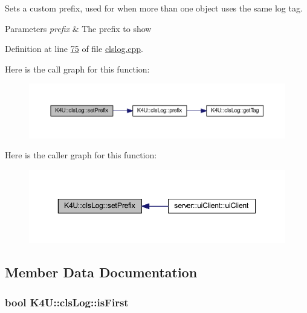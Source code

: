 Sets a custom prefix, used for when more than one object uses the same log tag. 


\begin{DoxyParams}{Parameters}
{\em prefix} & The prefix to show \\
\hline
\end{DoxyParams}


Definition at line \hyperlink{clslog_8cpp_source_l00075}{75} of file \hyperlink{clslog_8cpp_source}{clslog.\-cpp}.



Here is the call graph for this function\-:\nopagebreak
\begin{figure}[H]
\begin{center}
\leavevmode
\includegraphics[width=350pt]{da/d64/class_k4_u_1_1cls_log_acce6f46545b0de7dcc21b69dda54b246_cgraph}
\end{center}
\end{figure}




Here is the caller graph for this function\-:
\nopagebreak
\begin{figure}[H]
\begin{center}
\leavevmode
\includegraphics[width=350pt]{da/d64/class_k4_u_1_1cls_log_acce6f46545b0de7dcc21b69dda54b246_icgraph}
\end{center}
\end{figure}




\subsection{Member Data Documentation}
\hypertarget{class_k4_u_1_1cls_log_aacbc8798b8923df2c0c45333f88b8c5a}{
\subsubsection[{is\-First}]{\setlength{\rightskip}{0pt plus 5cm}bool K4\-U\-::cls\-Log\-::is\-First\hspace{0.3cm}{\ttfamily [private]}}}\label{da/d64/class_k4_u_1_1cls_log_aacbc8798b8923df2c0c45333f88b8c5a}


